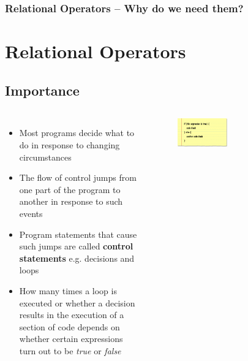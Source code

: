 \documentclass{beamer}
\begin{document}
\begin{frame}
    \frametitle{Relational Operators -- Why do we need them?}
    \section{Relational Operators} %
    \label{sec:relational_operators}
    \subsection{Importance} %
    \label{sub:importance}
    \begin{columns}
        \begin{itemize}
            \item Most programs decide what to do in response to changing circumstances
            \item The flow of control jumps from one part of the program to another in response to such events
            \item Program statements that cause such jumps are called \textbf{control statements} e.g. decisions and loops
            \item How many times a loop is executed or whether a decision results in the execution of a section of code depends on whether certain expressions turn out to be \textit{true} or \textit{false}
        \end{itemize}
        \begin{figure}
            \centering
            \includegraphics[scale=0.35]{if_else}
        \end{figure}
        \begin{figure}
            \centering

\end{figure}
\end{columns}
\end{frame}
\end{document}
